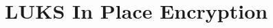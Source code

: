 \documentclass[../xdudla00-porting-Tang-to-Open-WRT.tex]{subfiles}
\begin{document}
\chapter{LUKS In Place Encryption}
\label{luksipc}
\end{document}
